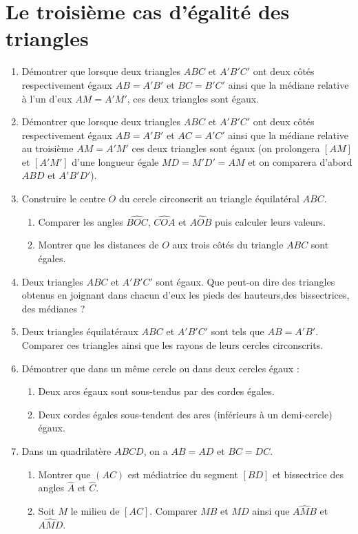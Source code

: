 
\chapter{Le troisième cas d'égalité des triangles}
\begin{enumerate}
\item Démontrer que lorsque deux triangles $ABC$ et $A'B'C'$ ont deux côtés respectivement égaux $AB=A'B'$ et $BC=B'C'$ ainsi que la médiane relative à l'un d'eux $AM = A'M'$, ces deux triangles sont égaux.
\item Démontrer que lorsque deux triangles $ABC$ et $A'B'C'$ ont deux côtés 
respectivement égaux $AB=A'B'$ et $AC=A'C'$ ainsi que la médiane relative au troisième 
$AM=A'M'$ ces deux triangles sont égaux (on prolongera $[AM]$ et $[A'M']$ d'une longueur égale $MD=M'D'=AM$ et on comparera d'abord $ABD$ et $A'B'D'$). 
\item Construire le centre $O$ du cercle circonscrit au triangle équilatéral $ABC$. 
\begin{enumerate}
\item Comparer les angles $\widehat{BOC}$, $\widehat{COA}$ et $\widehat{AOB}$ puis calculer leurs valeurs.
\item Montrer que les distances de $O$ aux trois côtés du triangle $ABC$ sont égales.
\end{enumerate}
\item Deux triangles $ABC$ et $A'B'C'$ sont égaux. Que peut-on dire des triangles obtenus en joignant dans chacun d'eux les pieds des hauteurs,des bissectrices, des médianes ?
\item Deux triangles équilatéraux $ABC$ et $A'B'C'$ sont tels que $AB=A'B'$. Comparer ces triangles ainsi que les rayons de leurs cercles circonscrits. 
\item Démontrer que dans un même cercle ou dans deux cercles égaux : \begin{enumerate}
\item Deux arcs égaux sont sous-tendus par des cordes égales. 
\item Deux cordes égales sous-tendent des arcs (inférieurs à un demi-cercle) égaux.
\end{enumerate}
\item Dans un quadrilatère $ABCD$, on a $AB=AD$ et $BC=DC$. 
\begin{enumerate}
\item Montrer que $(AC)$ est médiatrice du segment $[BD]$ et bissectrice des angles $\widehat{A}$ et $\widehat{C}$.
\item Soit $M$ le milieu de $[AC]$. Comparer $MB$ et $MD$ ainsi que $\widehat{AMB}$ et $\widehat{AMD}$.

\end{enumerate}
\end{enumerate}
